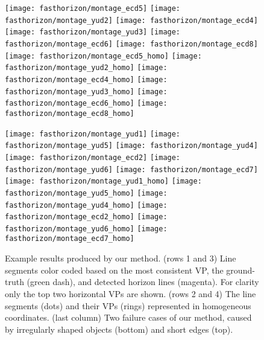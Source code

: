 \begin{figure*}
  \centering
  \texttt{[image: fasthorizon/montage\_ecd5]}
  \texttt{[image: fasthorizon/montage\_yud2]}
  \texttt{[image: fasthorizon/montage\_ecd4]}
  \texttt{[image: fasthorizon/montage\_yud3]}
  \texttt{[image: fasthorizon/montage\_ecd6]}
  \texttt{[image: fasthorizon/montage\_ecd8]}
  \\
  \texttt{[image: fasthorizon/montage\_ecd5\_homo]}
  \texttt{[image: fasthorizon/montage\_yud2\_homo]}
  \texttt{[image: fasthorizon/montage\_ecd4\_homo]}
  \texttt{[image: fasthorizon/montage\_yud3\_homo]}
  \texttt{[image: fasthorizon/montage\_ecd6\_homo]}
  \texttt{[image: fasthorizon/montage\_ecd8\_homo]}
  
  \texttt{[image: fasthorizon/montage\_yud1]}
  \texttt{[image: fasthorizon/montage\_yud5]}
  \texttt{[image: fasthorizon/montage\_yud4]}
  \texttt{[image: fasthorizon/montage\_ecd2]}
  \texttt{[image: fasthorizon/montage\_yud6]}
  \texttt{[image: fasthorizon/montage\_ecd7]}
  \\
  \texttt{[image: fasthorizon/montage\_yud1\_homo]}
  \texttt{[image: fasthorizon/montage\_yud5\_homo]}
  \texttt{[image: fasthorizon/montage\_yud4\_homo]}
  \texttt{[image: fasthorizon/montage\_ecd2\_homo]}
  \texttt{[image: fasthorizon/montage\_yud6\_homo]}
  \texttt{[image: fasthorizon/montage\_ecd7\_homo]}
  \caption{Example results produced by our method.  (rows 1 and 3)
    Line segments color coded based on the most consistent VP, the
    ground-truth (green dash), and detected horizon lines (magenta).
    For clarity only the top two horizontal VPs are shown.  (rows 2
    and 4) The line segments (dots) and their VPs (rings) represented
    in homogeneous coordinates. (last column) Two failure cases of our
    method, caused by irregularly shaped objects (bottom) and short
    edges (top).}
  \label{fig:examples}
\end{figure*}

